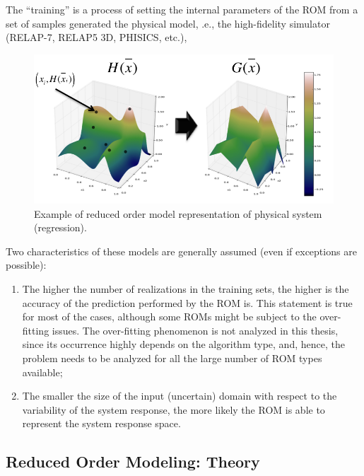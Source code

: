 The ``training'' is a process of setting the internal parameters of the ROM from a set
of samples generated the physical model, .e.,  
 the high-fidelity simulator (RELAP-7, RELAP5 
3D, PHISICS, etc.),
\begin{figure}[h!]
  \centering
  \includegraphics[width=1.0\textwidth]  {pics/ROMexampleOfPhysicalSystem.png}
  \caption{Example of reduced order model representation of physical system (regression).}
  \label{fig:ROMexampleOfPhysicalSystem}
\end{figure}

Two characteristics of these models 
are generally assumed (even if exceptions are possible):
\begin{enumerate}
  \item The higher the number of realizations in the training sets, the 
higher is the accuracy of the prediction performed by the ROM is. This 
statement is true for most of the cases, although some ROMs might be 
subject to the over-fitting issues. The over-fitting phenomenon is not 
analyzed in this thesis, since its occurrence highly depends on the 
algorithm type, and, hence, the problem needs to be analyzed for all 
the large number of ROM types available;
  \item The smaller the size of the input (uncertain) domain with 
  respect to the variability of the system response, the more likely the 
  ROM is able to represent the system response space.
\end{enumerate}

\subsection{Reduced Order Modeling: Theory}

